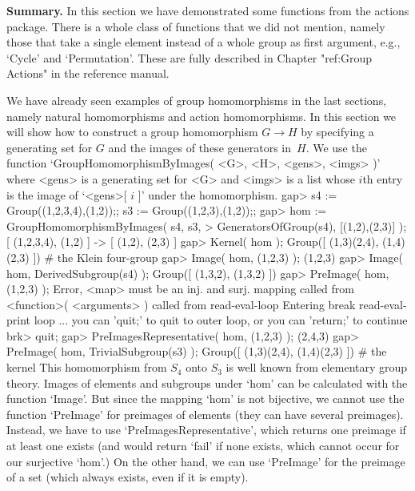 {\bf  Summary.} In this section we  have demonstrated some functions from
the actions package. There  is a whole class of  functions that we did
not mention, namely  those that take a  single element instead of a whole
group as first argument, e.g., `Cycle' and `Permutation'. These are fully
described  in Chapter "ref:Group Actions"  in the  reference
manual.


We   have already  seen  examples of   group homomorphisms  in  the  last
sections,  namely natural homomorphisms  and  action homomorphisms. In
this section we will show how to construct a  group homomorphism $G\to H$
by specifying a generating set for $G$ and the images of these generators
in~$H$. We use the function `GroupHomomorphismByImages( <G>, <H>, <gens>,
<imgs> )' where <gens> is a  generating set for <G> and  <imgs> is a list
whose $i$th entry is the image of `<gens>[ $i$ ]' under the homomorphism.
\beginexample
gap> s4 := Group((1,2,3,4),(1,2));; s3 := Group((1,2,3),(1,2));;
gap> hom := GroupHomomorphismByImages( s4, s3,
>           GeneratorsOfGroup(s4), [(1,2),(2,3)] );
[ (1,2,3,4), (1,2) ] -> [ (1,2), (2,3) ]
gap> Kernel( hom );
Group([ (1,3)(2,4), (1,4)(2,3) ])  # the Klein four-group
gap> Image( hom, (1,2,3) );
(1,2,3)
gap> Image( hom, DerivedSubgroup(s4) );
Group([ (1,3,2), (1,3,2) ])
\endexample
\begintt
gap> PreImage( hom, (1,2,3) );
Error, <map> must be an inj. and surj. mapping called from
<function>( <arguments> ) called from read-eval-loop
Entering break read-eval-print loop ...
you can 'quit;' to quit to outer loop, or
you can 'return;' to continue
brk> quit;
\endtt
\beginexample
gap> PreImagesRepresentative( hom, (1,2,3) );
(2,4,3)
gap> PreImage( hom, TrivialSubgroup(s3) );
Group([ (1,3)(2,4), (1,4)(2,3) ])  # the kernel
\endexample
This homomorphism  from $S_4$ onto  $S_3$  is well known  from elementary
group theory.  Images   of elements and  subgroups  under   `hom' can  be
calculated with the function `Image'. But since the mapping `hom' is  not
bijective, we  cannot use   the   function `PreImage' for  preimages   of
elements  (they can have   several preimages). Instead,   we have  to use
`PreImagesRepresentative', which  returns  one  preimage if at  least one
exists (and would  return `fail' if none  exists, which  cannot occur for
our surjective `hom'.)  On the other hand, we  can use `PreImage' for the
preimage of a set (which always exists, even if it  is empty).

